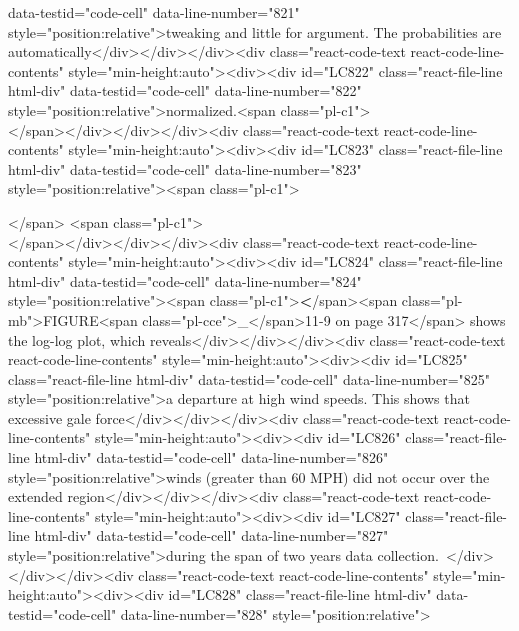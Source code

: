 {{{{{data-testid="code-cell" data-line-number="821" style="position:relative">tweaking and little for argument. The probabilities are automatically</div></div></div><div class="react-code-text react-code-line-contents" style="min-height:auto"><div><div id="LC822" class="react-file-line html-div" data-testid="code-cell" data-line-number="822" style="position:relative">normalized.<span class="pl-c1">\\</span></div></div></div><div class="react-code-text react-code-line-contents" style="min-height:auto"><div><div id="LC823" class="react-file-line html-div" data-testid="code-cell" data-line-number="823" style="position:relative"><span class="pl-c1">\strut</span> <span class="pl-c1">\\</span></div></div></div><div class="react-code-text react-code-line-contents" style="min-height:auto"><div><div id="LC824" class="react-file-line html-div" data-testid="code-cell" data-line-number="824" style="position:relative"><span class="pl-c1">\textbf</span>{<span class="pl-mb">FIGURE<span class="pl-cce">\_</span>11-9 on page 317</span>} shows the log-log plot, which reveals</div></div></div><div class="react-code-text react-code-line-contents" style="min-height:auto"><div><div id="LC825" class="react-file-line html-div" data-testid="code-cell" data-line-number="825" style="position:relative">a departure at high wind speeds. This shows that excessive gale force</div></div></div><div class="react-code-text react-code-line-contents" style="min-height:auto"><div><div id="LC826" class="react-file-line html-div" data-testid="code-cell" data-line-number="826" style="position:relative">winds (greater than 60 MPH) did not occur over the extended region</div></div></div><div class="react-code-text react-code-line-contents" style="min-height:auto"><div><div id="LC827" class="react-file-line html-div" data-testid="code-cell" data-line-number="827" style="position:relative">during the span of two years data collection.~</div></div></div><div class="react-code-text react-code-line-contents" style="min-height:auto"><div><div id="LC828" class="react-file-line html-div" data-testid="code-cell" data-line-number="828" style="position:relative">
}}}}}
